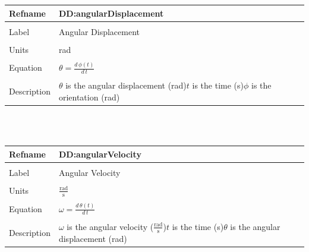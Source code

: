\documentclass[12pt]{article}
\begin{document}
\noindent \begin{minipage}{\textwidth}
\begin{tabular}{p{} p{}}
\toprule \textbf{Refname} & \textbf{DD:angularDisplacement}
\label{DD:angularDisplacement}
\\ \midrule \\
Label & Angular Displacement
\\ \midrule \\
Units & rad
\\ \midrule \\
Equation & $θ=\frac{d\,ϕ\left(t\right)}{d\,t}$
\\ \midrule \\
Description & $θ$ is the angular displacement (rad)\newline$t$ is the time (s)\newline$ϕ$ is the orientation (rad)
\\ \bottomrule \end{tabular}
\end{minipage}\\
~\newline
\noindent \begin{minipage}{\textwidth}
\begin{tabular}{p{} p{}}
\toprule \textbf{Refname} & \textbf{DD:angularVelocity}
\label{DD:angularVelocity}
\\ \midrule \\
Label & Angular Velocity
\\ \midrule \\
Units & $\frac{\text{rad}}{\text{s}}$
\\ \midrule \\
Equation & $ω=\frac{d\,θ\left(t\right)}{d\,t}$
\\ \midrule \\
Description & $ω$ is the angular velocity ($\frac{\text{rad}}{\text{s}}$)\newline$t$ is the time (s)\newline$θ$ is the angular displacement (rad)
\\ \bottomrule \end{tabular}
\end{minipage}\\
~\newline
\end{document}
